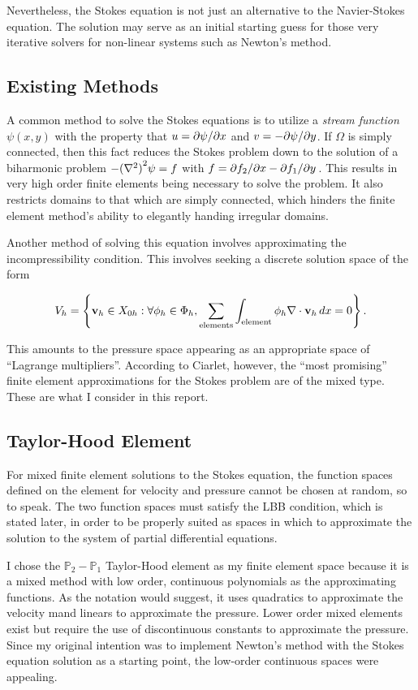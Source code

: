 \documentclass[12pt]{article}
\begin{document}
Nevertheless, the Stokes equation is not just an alternative to the
Navier-Stokes equation. The solution may serve as an initial starting guess for
those very iterative solvers for non-linear systems such as Newton's
method\cite{nm}.

\subsection{Existing Methods}
A common method to solve the Stokes equations is to utilize a \textit{stream
function} $\psi(x, y)$ with the property that $u = \partial \psi / \partial x$ and $v
= -\partial \psi / \partial y$. If $\Omega$ is simply connected, then this fact reduces
the Stokes problem down to the solution of a biharmonic problem $-{(\nabla^2)}^2
\psi = f$ with $f = \partial f_2 / \partial x - \partial f_1 / \partial y\,$\cite{c}. This results in
very high order finite elements being necessary to solve the problem. It also
restricts domains to that which are simply connected, which hinders the finite
element method's ability to elegantly handing irregular domains.

Another method of solving this equation involves approximating the
incompressibility condition\cite{c}. This involves seeking a discrete solution
space of the form

\begin{equation*}
    V_h = \left\{\mathbf{v}_h \in X_{0h} : \forall \phi_h \in \Phi_h,
    \sum_{\text{elements}} \int_{\text{element}} \phi_h \nabla \cdot \mathbf{v}_h
\, dx = 0\right\}.
\end{equation*}

This amounts to the pressure space appearing as an appropriate space of
``Lagrange multipliers''\cite{c}. According to Ciarlet, however, the ``most
promising'' finite element approximations for the Stokes problem are of the
mixed type\cite{c}. These are what I consider in this report.

\subsection{Taylor-Hood Element}
For mixed finite element solutions to the Stokes equation, the function spaces
defined on the element for velocity and pressure cannot be chosen at random, so
to speak. The two function spaces must satisfy the LBB condition, which is
stated later, in order to be properly suited as spaces in which to approximate
the solution to the system of partial differential equations.

I chose the $\mathbb{P}_2 - \mathbb{P}_1$ Taylor-Hood element as my finite
element space because it is a mixed method with low order, continuous
polynomials as the approximating functions. As the notation would suggest, it
uses quadratics to approximate the velocity mand linears to approximate the
pressure. Lower order mixed elements exist but require the use of discontinuous
constants to approximate the pressure. Since my original intention was to
implement Newton's method with the Stokes equation solution as a starting
point, the low-order continuous spaces were appealing.
\end{document}
